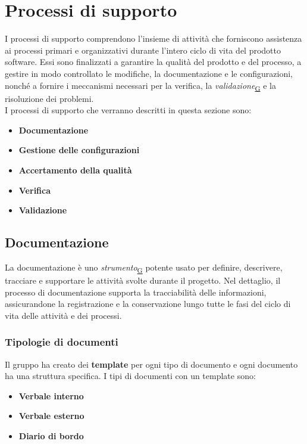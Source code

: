 \documentclass[a4paper,12pt]{article}
\begin{document}
\newpage

\section{Processi di supporto}
    I processi di supporto comprendono l'insieme di attività che forniscono assistenza ai processi primari e organizzativi durante l'intero ciclo di vita del prodotto software. Essi sono finalizzati a garantire la qualità del prodotto e del processo, a gestire in modo controllato le modifiche, la documentazione e le configurazioni, nonché a fornire i meccanismi necessari per la verifica, la \textit{validazione}\textsubscript{\href{https://atlasteam9.github.io/Atlas/glossario.html\#Validazione}{G}} e la risoluzione dei problemi.\\
    I processi di supporto che verranno descritti in questa sezione sono:
    \begin{itemize}
        \item \textbf{Documentazione}
        \item \textbf{Gestione delle configurazioni}
        \item \textbf{Accertamento della qualità}
        \item \textbf{Verifica}
        \item \textbf{Validazione}
    \end{itemize}
    
    \subsection{Documentazione}
    \label{subsec:documentazione}
        La documentazione è uno \textit{strumento}\textsubscript{\href{https://atlasteam9.github.io/Atlas/glossario.html\#Strumento}{G}} potente usato per definire, descrivere, tracciare e supportare le attività svolte durante il progetto. Nel dettaglio, il processo di documentazione supporta la tracciabilità delle informazioni, assicurandone la registrazione e la conservazione lungo tutte le fasi del ciclo di vita delle attività e dei processi. 

        \subsubsection{Tipologie di documenti}
            Il gruppo ha creato dei \textbf{template} per ogni tipo di documento e ogni documento ha una struttura specifica. I tipi di documenti con un template sono:
            \begin{itemize}
                \item \textbf{Verbale interno}
                \item \textbf{Verbale esterno}
                \item \textbf{Diario di bordo}
            \end{itemize}
\end{document}
